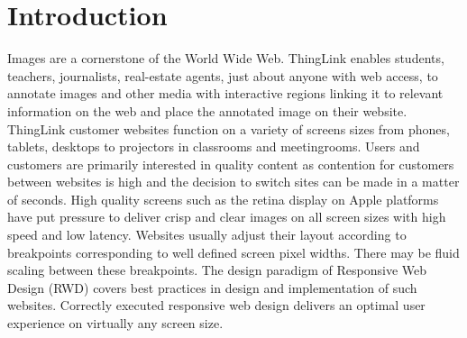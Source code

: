 \documentclass[english,12pt,a4paper,pdftex,elec,utf8, table]{aaltothesis}
\begin{document}
\section{Introduction}

\thispagestyle{empty}

Images are a cornerstone of the World Wide Web. ThingLink enables students, teachers, journalists, real-estate agents, just about anyone with web access, to annotate images and other media with interactive regions linking it to relevant information on the web and place the annotated image on their website. ThingLink customer websites function on a variety of screens sizes from phones, tablets, desktops to projectors in classrooms and meetingrooms. Users and customers are primarily interested in quality content as contention for customers between websites is high and the decision to switch sites can be made in a matter of seconds. High quality screens such as the retina display on Apple platforms have put pressure to deliver crisp and clear images on all screen sizes with high speed and low latency. Websites usually adjust their layout according to breakpoints corresponding to well defined screen pixel widths. There may be fluid scaling between these breakpoints. The design paradigm of Responsive Web Design (RWD) covers best practices in design and implementation of such websites. Correctly executed responsive web design delivers an optimal user experience on virtually any screen size.
\end{document}
